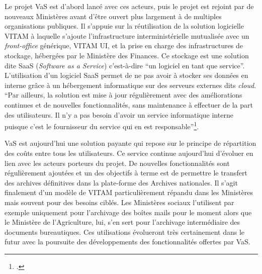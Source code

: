 Le projet VaS est d’abord lancé avec ces acteurs, puis le projet est rejoint par de nouveaux Ministères avant d’être ouvert plus largement à de multiples organisations publiques. Il s'appuie sur la réutilisation de la solution logicielle \gls{VITAM} à laquelle s’ajoute l’infrastructure interministérielle mutualisée avec un \textit{\gls{front-office}} générique, VITAM UI, et la prise en charge des infrastructures de stockage, hébergées par le Ministère des Finances. Ce stockage est une solution dite SaaS (\textit{Software as a Service}) c'est-à-dire \enquote{un logiciel en tant que service}. L’utilisation d’un logiciel SaaS permet de ne pas avoir à stocker ses données en interne grâce à un hébergement informatique sur des serveurs externes dits \textit{cloud}. \enquote{Par ailleurs, la solution est mise à jour régulièrement avec des améliorations continues et de nouvelles fonctionnalités, sans maintenance à effectuer de la part des utilisateurs. Il n’y a pas besoin d’avoir un service informatique interne puisque c’est le fournisseur du service qui en est responsable}\footcite{pascaud_pourquoi_nodate}.


VaS est aujourd’hui une solution payante qui repose sur le principe de répartition des coûts entre tous les utilisateurs. Ce service continue aujourd’hui d’évoluer en lien avec les acteurs porteurs du projet. De nouvelles fonctionnalités sont régulièrement ajoutées et un des objectifs à terme est de permettre le transfert des archives définitives dans la plate-forme des Archives nationales. Il s’agit finalement d’un modèle de \gls{VITAM} particulièrement répandu dans les Ministères mais souvent pour des besoins ciblés. Les Ministères sociaux l'utilisent par exemple uniquement pour l’archivage des boîtes mails pour le moment alors que le Ministère de l’Agriculture, lui, s’en sert pour l’archivage intermédiaire des documents bureautiques. Ces utilisations évolueront très certainement dans le futur avec la poursuite des développements des fonctionnalités offertes par VaS.
